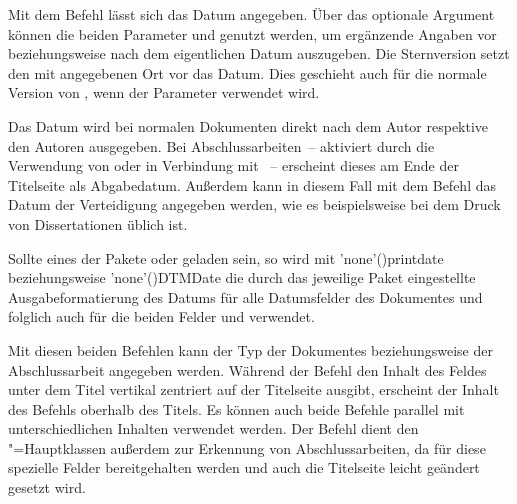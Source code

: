 \begin{DeclareEntity*}{}
\begin{DeclareEntity*}{}
\begin{DeclareEntity*}{}
\begin{Declaration}
\begin{Declaration}
\begin{Declaration}
\begin{Declaration}
\begin{Declaration}
\begin{Declaration}
Mit dem Befehl  lässt sich das Datum angegeben. 
%
Über das optionale Argument können die beiden Parameter 
 und  genutzt werden, um 
ergänzende Angaben vor beziehungsweise nach dem eigentlichen Datum auszugeben. 
Die Sternversion  setzt den mit  angegebenen Ort vor 
das Datum. Dies geschieht auch für die normale Version von , wenn 
der Parameter  verwendet wird.

Das Datum wird bei normalen Dokumenten direkt nach dem Autor respektive den 
Autoren ausgegeben. Bei Abschlussarbeiten~-- aktiviert durch die Verwendung von 
 oder  in Verbindung mit ~-- 
erscheint dieses am Ende der Titelseite als Abgabedatum. Außerdem kann in 
diesem Fall mit dem Befehl das Datum der Verteidigung 
angegeben werden, wie es beispielsweise bei dem Druck von Dissertationen üblich 
ist.

Sollte eines der Pakete  oder  geladen 
sein, so wird mit \Macro'none'(){printdate} beziehungsweise 
\Macro'none'(){DTMDate} die durch das jeweilige Paket 
eingestellte Ausgabeformatierung des Datums für alle Datumsfelder des 
Dokumentes und folglich auch für die beiden Felder  und 
 verwendet.
\end{Declaration}
\end{Declaration}
\end{Declaration}
\end{Declaration}
\end{Declaration}
\end{Declaration}

\begin{Declaration}
  {}
\begin{Declaration}
  {}

Mit diesen beiden Befehlen kann der Typ der Dokumentes beziehungsweise der 
Abschlussarbeit angegeben werden. Während der Befehl  den Inhalt 
des Feldes unter dem Titel vertikal zentriert auf der Titelseite ausgibt, 
erscheint der Inhalt des Befehls  oberhalb des Titels. Es können 
auch beide Befehle parallel mit unterschiedlichen Inhalten verwendet werden. 
Der Befehl  dient den \TUDScript"=Hauptklassen außerdem zur 
Erkennung von Abschlussarbeiten, da für diese spezielle Felder bereitgehalten 
werden und auch die Titelseite leicht geändert gesetzt wird.


\end{Declaration}
\end{Declaration}
\end{DeclareEntity*}
\end{DeclareEntity*}
\end{DeclareEntity*}
